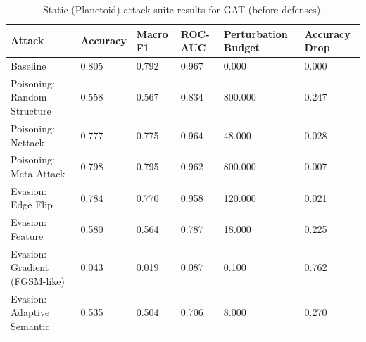 \begin{table}[t]
\centering
\small
\begin{tabular}{llllll}
\toprule
Attack & Accuracy & Macro F1 & ROC-AUC & Perturbation Budget & Accuracy Drop \\
\midrule
Baseline & 0.805 & 0.792 & 0.967 & 0.000 & 0.000 \\
Poisoning: Random Structure & 0.558 & 0.567 & 0.834 & 800.000 & 0.247 \\
Poisoning: Nettack & 0.777 & 0.775 & 0.964 & 48.000 & 0.028 \\
Poisoning: Meta Attack & 0.798 & 0.795 & 0.962 & 800.000 & 0.007 \\
Evasion: Edge Flip & 0.784 & 0.770 & 0.958 & 120.000 & 0.021 \\
Evasion: Feature & 0.580 & 0.564 & 0.787 & 18.000 & 0.225 \\
Evasion: Gradient (FGSM-like) & 0.043 & 0.019 & 0.087 & 0.100 & 0.762 \\
Evasion: Adaptive Semantic & 0.535 & 0.504 & 0.706 & 8.000 & 0.270 \\
\bottomrule
\end{tabular}

\caption{Static (Planetoid) attack suite results for GAT (before defenses).}
\label{tab:static_gat_attacks}
\end{table}
